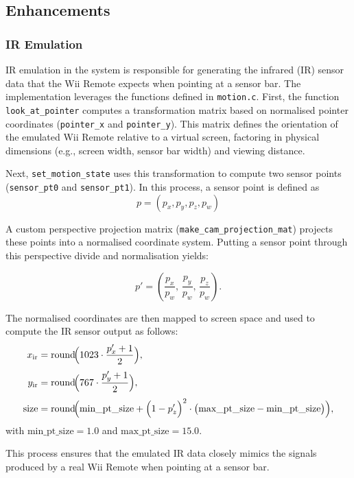 \subsection{Enhancements}


\subsubsection{IR Emulation}

IR emulation in the system is responsible for generating the infrared (IR)
sensor data that the Wii Remote expects when pointing at a sensor bar. The
implementation leverages the functions defined in \texttt{motion.c}. First, the
function \linebreak \texttt{look\_at\_pointer} computes a transformation matrix based on
normalised pointer coordinates (\texttt{pointer\_x} and \texttt{pointer\_y}).
This matrix defines the orientation of the emulated Wii Remote relative to a
virtual screen, factoring in physical dimensions (e.g., screen width, sensor bar
width) and viewing distance.

Next, \texttt{set\_motion\_state} uses this transformation to compute two sensor
points (\texttt{sensor\_pt0} and \texttt{sensor\_pt1}). In this process, a sensor point is defined as
\[
p = (p_x, p_y, p_z, p_w)
\]


A custom perspective projection matrix (\texttt{make\_cam\_projection\_mat}) projects these points into a normalised coordinate system. Putting a sensor point through this perspective divide and normalisation yields:

\[
p' = \left(\frac{p_x}{p_w},\, \frac{p_y}{p_w},\, \frac{p_z}{p_w}\right).
\]

The normalised coordinates are then mapped to screen space and used to compute the IR sensor output as follows:
\[
\begin{aligned}
x_{\text{ir}} &= \text{round}\!\Bigl(1023 \cdot \frac{p'_x + 1}{2}\Bigr),\\[1mm]
y_{\text{ir}} &= \text{round}\!\Bigl(767 \cdot \frac{p'_y + 1}{2}\Bigr),\\[1mm]
\text{size} &= \text{round}\!\Bigl(\text{min\_pt\_size} + \Bigl(1 - p'_z\Bigr)^2 \cdot \bigl(\text{max\_pt\_size} - \text{min\_pt\_size}\bigr)\Bigr),
\end{aligned}
\]
with \(\text{min\_pt\_size} = 1.0\) and \(\text{max\_pt\_size} = 15.0\).

This process ensures that the emulated IR data closely mimics the signals produced by a real Wii Remote when pointing at a sensor bar.


